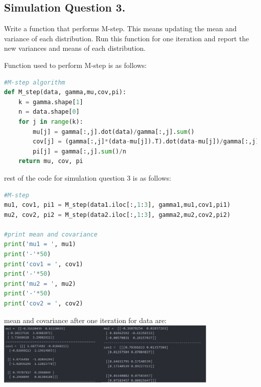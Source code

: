 \documentclass[12pt]{article}
\begin{document}
\clearpage
\subsection{Simulation Question 3.}
Write a function that performs M-step. This means updating the mean and variance of each distribution. Run this function for one iteration and report the new variances and means of each distribution.
\begin{qsolve}
    Function used to perform M-step is as follows:
    \begin{lstlisting}[language=Python,caption={M-step algorithm},label={code:M-step algorithm}]
#M-step algorithm
def M_step(data, gamma,mu,cov,pi):
    k = gamma.shape[1]
    n = data.shape[0]
    for j in range(k):
        mu[j] = gamma[:,j].dot(data)/gamma[:,j].sum()
        cov[j] = (gamma[:,j]*(data-mu[j]).T).dot(data-mu[j])/gamma[:,j].sum()
        pi[j] = gamma[:,j].sum()/n
    return mu, cov, pi
    \end{lstlisting}
    rest of the code for simulation question 3 is as follows:
    \begin{lstlisting}[language=Python,caption={M-step algorithm},label={code:M-step algorithm}]
#M-step
mu1, cov1, pi1 = M_step(data1.iloc[:,1:3], gamma1,mu1,cov1,pi1)
mu2, cov2, pi2 = M_step(data2.iloc[:,1:3], gamma2,mu2,cov2,pi2)

#print mean and covariance
print('mu1 = ', mu1)
print('-'*50)
print('cov1 = ', cov1)
print('-'*50)
print('mu2 = ', mu2)
print('-'*50)
print('cov2 = ', cov2)
        \end{lstlisting}
    \splitqsolve
    mean and covariance after one iteration for data are:
    \tcblower
    \centering
    \includegraphics[width=0.8\textwidth]{outputs/output20.png}
    \label{fig:fig7}

\end{qsolve}

\clearpage
\end{document}
